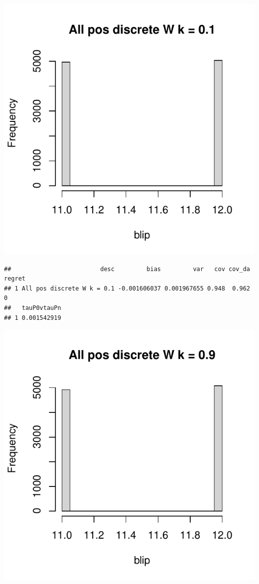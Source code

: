 \documentclass[11pt]{article}\usepackage[]{graphicx}\usepackage[table]{xcolor}
\makeatletter
\def\maxwidth{ %
  \ifdim\Gin@nat@width>\linewidth
    \linewidth
  \else
    \Gin@nat@width
  \fi
}
\newenvironment{kframe}{%
 \def\at@end@of@kframe{}%
 \ifinner\ifhmode%
  \def\at@end@of@kframe{\end{minipage}}%
  \begin{minipage}{\columnwidth}%
 \fi\fi%
 \def\FrameCommand##1{\hskip\@totalleftmargin \hskip-\fboxsep
 \colorbox{shadecolor}{##1}\hskip-\fboxsep
     \hskip-\linewidth \hskip-\@totalleftmargin \hskip\columnwidth}%
 \MakeFramed {\advance\hsize-\width
   \@totalleftmargin\z@ \linewidth\hsize
   \@setminipage}}%
 {\par\unskip\endMakeFramed%
 \at@end@of@kframe}
\newenvironment{knitrout}{}{} %
\makeatother
\begin{document}










\begin{knitrout}
\color{fgcolor}
\includegraphics[width=\maxwidth]{figure/unnamed-chunk-4-1} 
\begin{kframe}\begin{verbatim}
##                         desc         bias         var   cov cov_da regret
## 1 All pos discrete W k = 0.1 -0.001606037 0.001967655 0.948  0.962      0
##   tauP0vtauPn
## 1 0.001542919
\end{verbatim}
\end{kframe}
\includegraphics[width=\maxwidth]{figure/unnamed-chunk-4-2} 

\end{knitrout}
\end{document}
